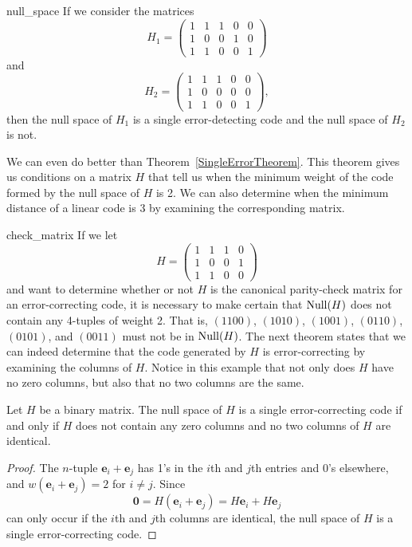  
\begin{example}{null_space}
If we consider the matrices
\[
H_1 =
\begin{pmatrix}
1 & 1 & 1 & 0 & 0 \\
1 & 0 & 0 & 1 & 0 \\
1 & 1 & 0 & 0 & 1
\end{pmatrix}
\]
and
\[
H_2 =
\begin{pmatrix}
1 & 1 & 1 & 0 & 0 \\
1 & 0 & 0 & 0 & 0 \\
1 & 1 & 0 & 0 & 1
\end{pmatrix},
\]
then the null space of $H_1$ is a single error-detecting code and the
null space of $H_2$ is not. 
\end{example}
 
 
We can even do better than Theorem~\ref{SingleErrorTheorem}. This theorem gives us
conditions on a matrix $H$ that tell us when the minimum weight of
the code formed by the null space of $H$ is 2.  We can also
determine when the minimum distance of a linear code is 3 by
examining the corresponding matrix.
 
 
\begin{example}{check_matrix}
If we let
\[
H =
\begin{pmatrix}
1 & 1 & 1 & 0 \\
1 & 0 & 0 & 1 \\
1 & 1 & 0 & 0
\end{pmatrix}
\]
and  want to determine whether or not $H$ is the canonical
parity-check matrix for an error-correcting code, it is necessary to
make certain that ${\rm Null}(H)$ does not contain any 4-tuples of weight
2. That is, $(1100)$, $(1010)$, $(1001)$, $(0110)$, $(0101)$, and
$(0011)$ must not be in ${\rm Null}(H)$.  The next theorem states that 
we can
indeed determine that the code generated by $H$ is error-correcting by
examining the columns of $H$. Notice in this example that not only
does $H$ have no zero columns, but also that no two columns are the
same. 
\end{example}
 
 
\begin{theorem}
Let $H$ be a binary matrix. The null space of $H$ is a single
error-correcting code if and only if $H$ does not contain any zero
columns and no two columns of $H$ are identical.
\end{theorem}
 
 
\begin{proof}
The $n$-tuple ${\mathbf e}_{i} +{\mathbf e}_{j}$ has 1's in the $i$th and
$j$th entries and 0's elsewhere, and $w( {\mathbf e}_{i} +{\mathbf
e}_{j}) = 2$ for $i \neq j$. Since
\[
{\mathbf 0}
= H({\mathbf e}_{i} +{\mathbf e}_{j})
= H{\mathbf e}_{i} + H{\mathbf e}_{j}
\]
can only occur if the $i$th and $j$th columns are identical, the
null space of $H$ is a single error-correcting code.
\end{proof}
 
